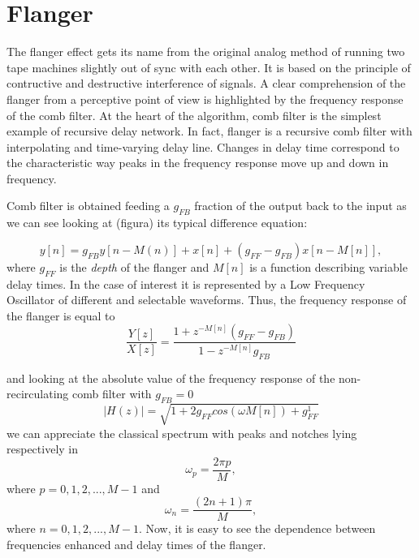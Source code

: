 \section{Flanger}
The flanger effect gets its name from the original analog method of running two tape machines slightly out of sync with each other. It is based on the principle of contructive and destructive interference of signals.
A clear comprehension of the flanger from a perceptive point of view  is highlighted by the frequency response of the comb filter. 
At the heart of the algorithm, comb filter is the simplest example of recursive delay network.
In fact, flanger is a recursive comb filter with interpolating and time-varying delay line. Changes in delay time correspond to the characteristic way peaks in the frequency response move up and down in frequency\cite{puckette2006theory}.

Comb filter is obtained feeding a $g_{FB}$ fraction of the output back to the input as we can see looking at (figura) its typical difference equation:

\[
y[n] = g_{FB} y[n - M(n)] + x[n] + (g_{FF} - g_{FB}) x[n - M[n]],
\]
where $g_{FF}$ is the \textit{depth} of the flanger and $M[n]$ is a function describing variable delay times. In the case of interest it is represented by a Low Frequency Oscillator of different and selectable waveforms. Thus, the frequency response of the flanger is equal to 
\[
\frac{Y[z]}{X[z]} = \frac{1 + z^{-M[n]} (g_{FF} - g_{FB})} {1 - z^{-M[n]}  g_{FB} }
\]

and looking at the absolute value of the frequency response of the non-recirculating comb filter with $g_{FB} = 0$ 
\[
|H(z)| = \sqrt{ 1 + 2g_{FF} cos(\omega M[n]) + g_{FF}^1}
\]
we can appreciate the classical spectrum with peaks and notches lying respectively in 
\[
\omega_p = \frac{2 \pi p}{M},
\]
where $p = 0, 1, 2, ..., M-1$ and 
\[
\omega_n = \frac{(2n+1) \pi}{M},
\]
where $n = 0, 1, 2, ..., M-1$. Now, it is easy to see the dependence between frequencies enhanced and delay times of the flanger. 


